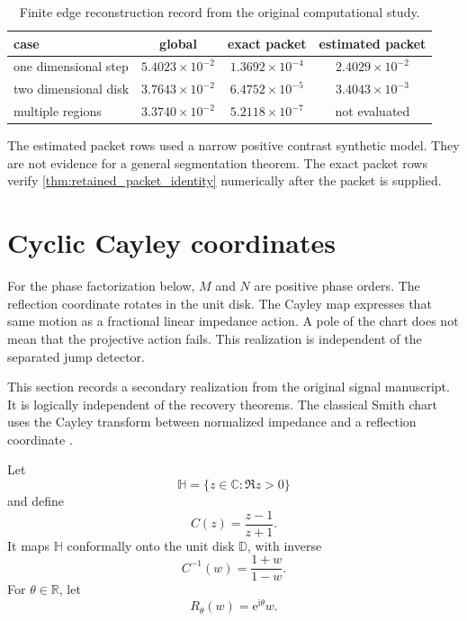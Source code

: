 \documentclass[11pt,letterpaper]{article}
\theoremstyle{plain}
\theoremstyle{plain}
\theoremstyle{plain}
\theoremstyle{definition}
\theoremstyle{definition}
\theoremstyle{definition}
\theoremstyle{definition}
\theoremstyle{remark}
\theoremstyle{remark}
\theoremstyle{remark}
\theoremstyle{remark}
\newcommand{\ii}{\mathrm i}
\newcommand{\CC}{\mathbb C}
\newcommand{\RR}{\mathbb R}
\newcommand{\e}{\mathrm e}
\begin{document}
\begin{table}
\centering
\caption{Finite edge reconstruction record from the original computational study.}
\label{tab:edge_record}
\small
\begin{tabular}{lccc}
\toprule
case & global & exact packet & estimated packet\\
\midrule
one dimensional step & \(5.4023\times10^{-2}\) & \(1.3692\times10^{-4}\) & \(2.4029\times10^{-2}\)\\
two dimensional disk & \(3.7643\times10^{-2}\) & \(6.4752\times10^{-5}\) & \(3.4043\times10^{-3}\)\\
multiple regions & \(3.3740\times10^{-2}\) & \(5.2118\times10^{-7}\) & not evaluated\\
\bottomrule
\end{tabular}
\end{table}

The estimated packet rows used a narrow positive contrast synthetic model. They are not evidence for a general segmentation theorem. The exact packet rows verify \cref{thm:retained_packet_identity} numerically after the packet is supplied.

\section{Cyclic Cayley coordinates}\label{extension:section:14}\label{sec:cayley}

\begin{interpretation}[title={Keep the rotation and its chart separate}]
For the phase factorization below, $M$ and $N$ are positive phase orders. The reflection coordinate rotates in the unit disk. The Cayley map expresses that same motion as a fractional linear impedance action. A pole of the chart does not mean that the projective action fails. This realization is independent of the separated jump detector.
\end{interpretation}

This section records a secondary realization from the original signal manuscript. It is logically independent of the recovery theorems. The classical Smith chart uses the Cayley transform between normalized impedance and a reflection coordinate \cite{Smith1969}.

Let
\[
\mathbb H
=
\{z\in\CC:\Re z>0\}
\]
and define
\[
C(z)=\frac{z-1}{z+1}.
\]
It maps \(\mathbb H\) conformally onto the unit disk \(\mathbb D\), with inverse
\[
C^{-1}(w)=\frac{1+w}{1-w}.
\]
For \(\theta\in\RR\), let
\[
R_\theta(w)=\e^{\ii\theta}w.
\]
\end{document}
